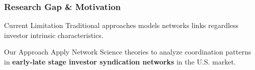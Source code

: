 \begin{frame}
\frametitle{Research Gap \& Motivation}

\begin{block}{Current Limitation}
Traditional approaches models networks links regardless investor intrinsic characteristics.
\end{block}

\vspace{0.4cm}

\begin{alertblock}{Our Approach}
Apply Network Science theories to analyze coordination patterns in \textbf{early-late stage investor syndication networks} in the U.S. market.
\end{alertblock}



\end{frame}

